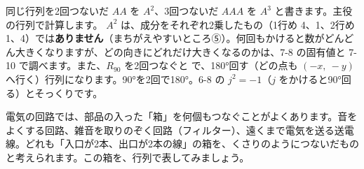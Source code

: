 同じ行列を2回つないだ $AA$ を $A^2$、3回つないだ $AAA$ を $A^3$ と書きます。主役の行列で計算します。
$A^2$ は、成分をそれぞれ2乗したもの（1行め 4、1、2行め 1、4）では\textbf{ありません}（まちがえやすいところ⑤）。何回もかけると数がどんどん大きくなりますが、どの向きにどれだけ大きくなるのかは、7-8 の固有値と 7-10 で調べます。また、$R_{90}$ を2回つなぐと
で、180°回す（どの点も $(-x,\ -y)$ へ行く）行列になります。90°を2回で180°。6-8 の $j^2=-1$（$j$ をかけると90°回る）とそっくりです。



\label{bk:7-3:hako}

電気の回路では、部品の入った「箱」を何個もつなぐことがよくあります。音をよくする回路、雑音を取りのぞく回路（フィルター）、遠くまで電気を送る送電線。どれも「入口が2本、出口が2本の線」の箱を、くさりのようにつないだものと考えられます。この箱を、行列で表してみましょう。


